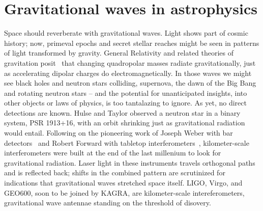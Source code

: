 


    \section{Gravitational waves in astrophysics}
    \label{grav_waves_astro}

        Space should reverberate with gravitational waves. 
Light shows part of cosmic history; now, primeval epochs and secret stellar reaches might be seen in patterns of light transformed by gravity. 
General Relativity and related theories of gravitation posit~\cite{EinsteinRosen1937} that changing quadropolar masses radiate gravitationally, just as accelerating dipolar charges do electromagnetically. 
In those waves we might see black holes and neutron stars colliding, supernova, the dawn of the Big Bang and rotating neutron stars -- and the potential for unanticipated insights, into other objects or laws of physics, is too tantalazing to ignore. 
As yet, no direct detections are known. 
Hulse and Taylor \cite{HulseTaylor1975} observed a neutron star in a binary system, PSR 1913+16, with an orbit shrinking just as gravitational radiation would entail. 
Following on the pioneering work of Joseph Weber with bar detectors~\cite{Weber1960} and Robert Forward with tabletop interferometers~\cite{Forward1978}, kilometer-scale interferometers were built at the end of the last millenium to look for gravitational radiation. 
Laser light in these instruments travels orthogonal paths and is reflected back; shifts in the combined pattern are scrutinized for indications that gravitational waves stretched space itself. 
LIGO, Virgo, and GEO600, soon to be joined by KAGRA, are kilometer-scale intereferometers, gravitational wave antennae standing on the threshold of disovery.

